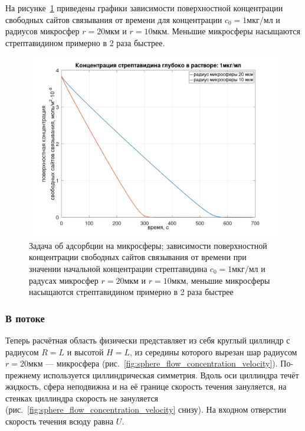 \documentclass[oneside,final,12pt]{extreport}
\begin{document}
На рисунке~\ref{fig:sphere_stationary_big_small}
приведены графики зависимости поверхностной концентрации
свободных сайтов связывания от времени для концентрации
$c_0 = 1\text{мкг}/\text{мл}$ и радиусов микросфер
$r = 20\text{мкм}$ и $r = 10\text{мкм}$.
Меньшие микросферы насыщаются стрептавидином примерно в 2 раза быстрее.

\begin{figure}
  \centering
  \includegraphics[width=.7\textwidth]{pic/sphere_stationary_big_small}

  \caption{%
    \label{fig:sphere_stationary_big_small}%
    Задача об адсорбции на микросферы;
    зависимости поверхностной концентрации свободных сайтов связывания
    от времени при значении начальной концентрации стрептавидина
    $c_0 = 1\text{мкг}/\text{мл}$ и радусах микросфер
    $r = 20\text{мкм}$ и $r = 10\text{мкм}$,
    меньшие микросферы насыщаются стрептавидином примерно в 2 раза быстрее
  }

\end{figure}



\FloatBarrier{}
\subsubsection*{В потоке}

Теперь расчётная область физически представляет из себя круглый циллиндр
с радиусом $R = L$ и высотой $H = L$,
из середины которого вырезан шар радиусом $r = 20\text{мкм}$ --- микросфера
(рис.~\ref{fig:sphere_flow_concentration_velocity}).
По-прежнему используется циллиндрическая симметрия.
Вдоль оси циллиндра течёт жидкость,
сфера неподвижна и на её границе скорость течения зануляется,
на стенках циллиндра скорость не зануляется
(рис.~\ref{fig:sphere_flow_concentration_velocity} снизу).
На входном отверстии скорость течения всюду равна $U$.
\end{document}
